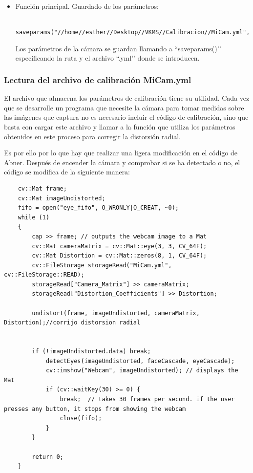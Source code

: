 \begin{itemize}
    \item Función principal. Guardado de los parámetros: \\
    
    \begin{verbatim} 
    saveparams("//home//esther//Desktop//VKMS//Calibracion//MiCam.yml",cameraMatrix,distCoeffs,rvecs,tvecs,rms);
    \end{verbatim} 
    
Los parámetros de la cámara se guardan llamando a ``saveparams()’’ especificando la ruta y el archivo ``.yml’’  donde se introducen.

\end{itemize}


\subsubsection{Lectura del archivo de calibración MiCam.yml}\label{s3_2_2_3}

El archivo que almacena los parámetros de calibración tiene su utilidad. Cada vez que se desarrolle un programa que necesite la cámara para tomar medidas sobre las imágenes que captura no es necesario incluir el código de calibración, sino que basta con cargar este archivo y llamar a la función que utiliza los parámetros obtenidos en este proceso para corregir la distorsión radial.

Es por ello por lo que hay que realizar una ligera modificación en el código de Abner. Después de encender la cámara y comprobar si se ha detectado o no, el código se modifica de la siguiente manera: \\

    \begin{verbatim} 
    cv::Mat frame;
    cv::Mat imageUndistorted;
    fifo = open("eye_fifo", O_WRONLY|O_CREAT, ~0);
    while (1)
    {
        cap >> frame; // outputs the webcam image to a Mat
        cv::Mat cameraMatrix = cv::Mat::eye(3, 3, CV_64F);
        cv::Mat Distortion = cv::Mat::zeros(8, 1, CV_64F);		
	    cv::FileStorage storageRead("MiCam.yml",    cv::FileStorage::READ);
	    storageRead["Camera_Matrix"] >> cameraMatrix;
	    storageRead["Distortion_Coefficients"] >> Distortion;
      
        undistort(frame, imageUndistorted, cameraMatrix, Distortion);//corrijo distorsion radial
      
  
        if (!imageUndistorted.data) break;
            detectEyes(imageUndistorted, faceCascade, eyeCascade);
            cv::imshow("Webcam", imageUndistorted); // displays the Mat
            if (cv::waitKey(30) >= 0) {
		        break;  // takes 30 frames per second. if the user presses any button, it stops from showing the webcam
		        close(fifo);
		    }
        }
  
        return 0;
    }
    \end{verbatim} 
    
